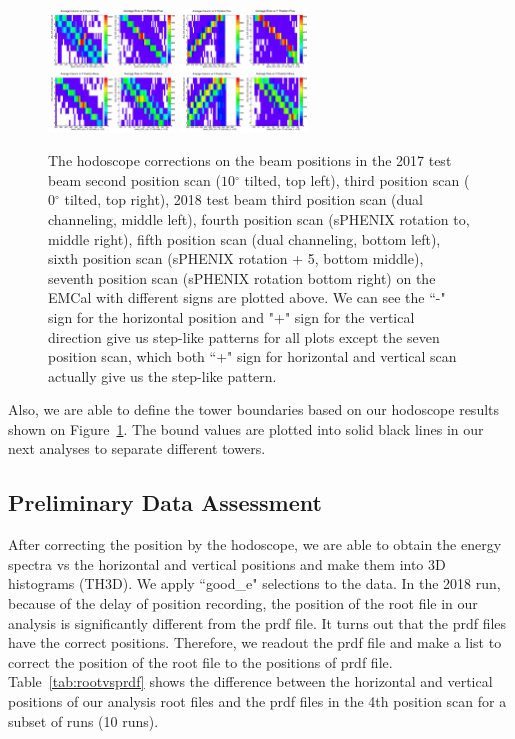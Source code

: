 \documentclass[hidelinks,11pt]{article}
\numberwithin{figure}{section}
\numberwithin{table}{section}
\newcommand{\degree}{\mbox{$^\circ$}\xspace}
\begin{document}
\begin{figure}[hbtp]
\begin{center}
\includegraphics[width=0.30\textwidth]{Plots/Hodo/Hodoscope20186th.png}
\includegraphics[width=0.30\textwidth]{Plots/Hodo/Hodoscope20187th.png}
\caption{The hodoscope corrections on the beam positions in the 2017 test beam second position scan ($10 \degree$ tilted, top left), third position scan ($0 \degree$ tilted, top right), 2018 test beam third position scan (dual channeling, middle left), fourth position scan (sPHENIX rotation to, middle right), fifth position scan (dual channeling, bottom left), sixth position scan (sPHENIX rotation + 5, bottom middle),  seventh position scan (sPHENIX rotation bottom right) on the EMCal with different signs are plotted above. We can see the ``-" sign for the horizontal position and "+" sign for the vertical direction give us step-like patterns for all plots except the seven position scan, which both  ``+" sign for horizontal and vertical scan actually give us the step-like pattern.}
\label{fig:hodoCorr}
\end{center}
\end{figure} 

\noindent Also, we are able to define the tower boundaries based on our hodoscope results shown on Figure~\ref{fig:hodoCorr}. The bound values are plotted into solid black lines in our next analyses to separate different towers.  

\subsection{Preliminary Data Assessment}

After correcting the position by the hodoscope, we are able to obtain the energy spectra vs the horizontal and vertical positions and make them into 3D histograms (TH3D). We apply ``good\_e" selections to the data. In the 2018 run, because of the delay of position recording, the position of the root file in our analysis is significantly different from the prdf file. It turns out that the prdf files have the correct positions. Therefore, we readout the prdf file and make a list to correct the position of the root file to the positions of prdf file. Table~\ref{tab:rootvsprdf} shows the difference between the horizontal and vertical positions of our analysis root files and the prdf files in the 4th position scan for a subset of runs (10 runs).
\end{document}
